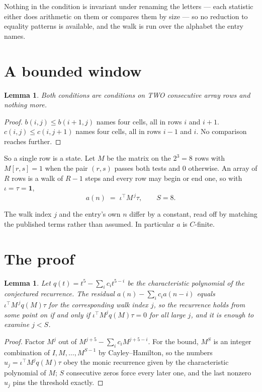 \documentclass[11pt,a4paper]{article}
\theoremstyle{plain}
\newtheorem{lemma}[theorem]{Lemma}
\theoremstyle{definition}
\begin{document}
Nothing in the condition is invariant under renaming the letters --- each statistic either does
arithmetic on them or compares them by size --- so no reduction to equality patterns is
available, and the walk is run over the alphabet the entry names.

\section{A bounded window}

\begin{lemma}\label{lem:win}
Both conditions are conditions on TWO consecutive array rows and nothing more.
\end{lemma}

\begin{proof}
$b(i,j)\le b(i{+}1,j)$ names four cells, all in rows $i$ and $i+1$. $c(i,j)\le c(i,j{+}1)$
names four cells, all in rows $i-1$ and $i$. No comparison reaches further.
\end{proof}

So a single row is a state. Let $M$ be the matrix on the $2^{3}=8$ rows with
$M[r,s]=1$ when the pair $(r,s)$ passes both tests and $0$ otherwise. An array of $R$ rows is a
walk of $R-1$ steps and every row may begin or end one, so with $\iota=\tau=\mathbf{1}$,
\[
a(n)\;=\;\iota^{\!\top}M^{\,j}\tau ,\qquad S=8.
\]

The walk index $j$ and the entry's own $n$ differ by a constant, read off by matching the
published terms rather than assumed. In particular $a$ is $C$-finite.

\section{The proof}

\begin{lemma}\label{lem:crit}
Let $q(t)=t^{5}-\sum_i c_it^{5-i}$ be the characteristic polynomial of the
conjectured recurrence. The residual $a(n)-\sum_ic_ia(n-i)$ equals
$\iota^{\!\top}M^{\,j}q(M)\tau$ for the corresponding walk index $j$, so the recurrence
holds from some point on if and only if $\iota^{\!\top}M^{j}q(M)\tau=0$ for all large $j$,
and it is enough to examine $j<S$.
\end{lemma}

\begin{proof}
Factor $M^{j}$ out of $M^{j+5}-\sum_ic_iM^{j+5-i}$. For the bound, $M^{S}$
is an integer combination of $I,M,\dots,M^{S-1}$ by Cayley--Hamilton, so the numbers
$u_j=\iota^{\!\top}M^{j}q(M)\tau$ obey the monic recurrence given by the characteristic
polynomial of $M$; $S$ consecutive zeros force every later one, and the last nonzero $u_j$
pins the threshold exactly.
\end{proof}
\end{document}

